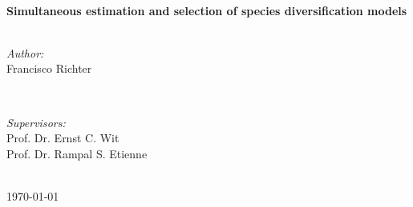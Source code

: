 \documentclass[letterpaper,12pt]{report} %
\begin{document}
\begin{titlepage}
\HRule \\[0.4cm]
{ \huge \bfseries Simultaneous estimation and selection of species diversification models}\\[0.4cm] %
\HRule \\[1.5cm]
 

\begin{minipage}{0.4\textwidth}
\begin{flushleft} \large
\emph{Author:}\\
Francisco Richter %
\end{flushleft}
\end{minipage}
~
\begin{minipage}{0.4\textwidth}
\begin{flushright} \large
\emph{Supervisors:} \\
Prof. Dr. Ernst C. Wit\\ %
Prof. Dr. Rampal S. Etienne
\end{flushright}
\end{minipage}\\[4cm]



{\large \today}\\[3cm] %


 


\end{titlepage}
\newpage
\thispagestyle{empty}
\mbox{}
\newpage
\tableofcontents
\newpage
\thispagestyle{empty}
\mbox{}
\newpage




\newpage
%




\newpage


\newpage

\newpage

 
%

\end{document}
